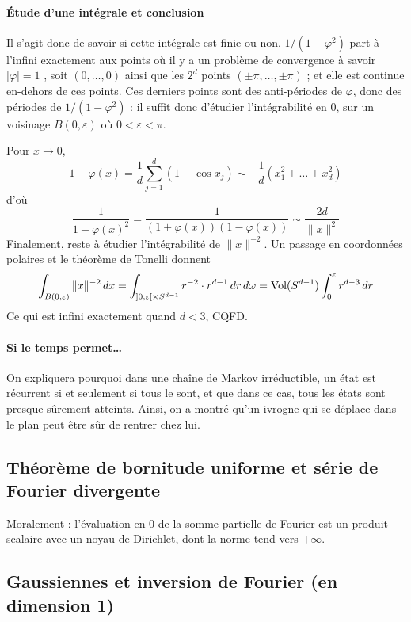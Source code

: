 \documentclass[a4paper, 11pt]{article}
\begin{document}
\paragraph{Étude d'une intégrale et conclusion} Il s'agit donc de savoir si
cette intégrale est finie ou non. $1/(1-\varphi^2)$ part à l'infini exactement
aux points où il y a un problème de convergence à savoir $|\varphi| = 1$ , soit
$(0,\ldots,0)$ ainsi que les $2^d$ points $(\pm \pi, \ldots, \pm \pi)$ ; et elle
est continue en-dehors de ces points. Ces derniers points sont des anti-périodes
de $\varphi$, donc des périodes de $1/(1-\varphi^2)$ : il suffit donc d'étudier
l'intégrabilité en 0, sur un voisinage $B(0,\varepsilon)$ où $0 < \varepsilon <
\pi$.

Pour $x \to 0$,
\[ 1 - \varphi(x) = \frac{1}{d} \sum_{j=1}^d (1 - \cos x_j) \sim
  -\frac{1}{d}(x_1^2 + \ldots + x_d^2) \] d'où
\[\frac{1}{1 - \varphi(x)^2} = \frac{1}{(1 + \varphi(x))(1 - \varphi(x))} \sim
  \frac{2d}{\|x\|^2} \]
Finalement, reste à étudier l'intégrabilité de $\|x\|^{-2}$. Un passage en
coordonnées polaires et le théorème de Tonelli donnent
\[ \int_{B(0,\varepsilon)} \|x\|^{-2}\,dx = \int_{]0,\varepsilon[ \times S^{d-1}}
  r^{-2} \cdot r^{d-1}\,dr\,d\omega = \textnormal{Vol}(S^{d-1}) \int_0^\varepsilon
  r^{d-3}\,dr \]
Ce qui est infini exactement quand $d < 3$, CQFD.

\paragraph{Si le temps permet…} On expliquera pourquoi dans une chaîne de Markov
irréductible, un état est récurrent si et seulement si tous le sont, et que dans
ce cas, tous les états sont presque sûrement atteints. Ainsi, on a montré qu'un
ivrogne qui se déplace dans le plan peut être sûr de rentrer chez lui.


\subsection{Théorème de bornitude uniforme et série de Fourier divergente}

Moralement : l'évaluation en 0 de la somme partielle de Fourier est un produit
scalaire avec un noyau de Dirichlet, dont la norme tend vers $+\infty$.

\subsection{Gaussiennes et inversion de Fourier (en dimension 1)}
\end{document}
